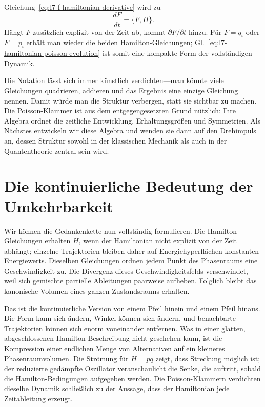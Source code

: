 Gleichung~\eqref{eq:l7-f-hamiltonian-derivative} wird zu
\begin{equation}
  \boxed{\frac{dF}{dt}=\{F,H\}.}
  \label{eq:l7-hamiltonian-poisson-evolution}
\end{equation}
Hängt \(F\) zusätzlich explizit von der Zeit ab, kommt \(\partial F/\partial t\) hinzu. Für \(F=q_i\) oder \(F=p_i\) erhält man wieder die beiden Hamilton-Gleichungen; Gl.~\eqref{eq:l7-hamiltonian-poisson-evolution} ist somit eine kompakte Form der vollständigen Dynamik.

Die Notation lässt sich immer künstlich verdichten---man könnte viele Gleichungen quadrieren, addieren und das Ergebnis eine einzige Gleichung nennen. Damit würde man die Struktur verbergen, statt sie sichtbar zu machen. Die Poisson-Klammer ist aus dem entgegengesetzten Grund nützlich: Ihre Algebra ordnet die zeitliche Entwicklung, Erhaltungsgrößen und Symmetrien. Als Nächstes entwickeln wir diese Algebra und wenden sie dann auf den Drehimpuls an, dessen Struktur sowohl in der klassischen Mechanik als auch in der Quantentheorie zentral sein wird.

\section{Die kontinuierliche Bedeutung der Umkehrbarkeit}

Wir können die Gedankenkette nun vollständig formulieren. Die Hamilton-Gleichungen erhalten \(H\), wenn der Hamiltonian nicht explizit von der Zeit abhängt; einzelne Trajektorien bleiben daher auf Energiehyperflächen konstanten Energiewerts. Dieselben Gleichungen ordnen jedem Punkt des Phasenraums eine Geschwindigkeit zu. Die Divergenz dieses Geschwindigkeitsfelds verschwindet, weil sich gemischte partielle Ableitungen paarweise aufheben. Folglich bleibt das kanonische Volumen eines ganzen Zustandsraums erhalten.

Das ist die kontinuierliche Version von einem Pfeil hinein und einem Pfeil hinaus. Die Form kann sich ändern, Winkel können sich ändern, und benachbarte Trajektorien können sich enorm voneinander entfernen. Was in einer glatten, abgeschlossenen Hamilton-Beschreibung nicht geschehen kann, ist die Kompression einer endlichen Menge von Alternativen auf ein kleineres Phasenraumvolumen. Die Strömung für \(H=pq\) zeigt, dass Streckung möglich ist; der reduzierte gedämpfte Oszillator veranschaulicht die Senke, die auftritt, sobald die Hamilton-Bedingungen aufgegeben werden. Die Poisson-Klammern verdichten dieselbe Dynamik schließlich zu der Aussage, dass der Hamiltonian jede Zeitableitung erzeugt.

